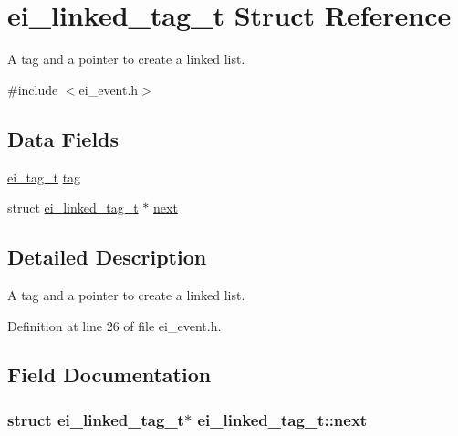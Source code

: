 \hypertarget{structei__linked__tag__t}{\section{ei\+\_\+linked\+\_\+tag\+\_\+t Struct Reference}
\label{structei__linked__tag__t}
}


A tag and a pointer to create a linked list.  




{\ttfamily \#include $<$ei\+\_\+event.\+h$>$}

\subsection*{Data Fields}
\begin{DoxyCompactItemize}
\item 
\hyperlink{ei__event_8h_a24a8242260cfd8ddb6ef915f3de5a10f}{ei\+\_\+tag\+\_\+t} \hyperlink{structei__linked__tag__t_aa1c771b8b7ac760ee10d33d5a29c97d7}{tag}
\item 
struct \hyperlink{structei__linked__tag__t}{ei\+\_\+linked\+\_\+tag\+\_\+t} $\ast$ \hyperlink{structei__linked__tag__t_a86bfd7536ee8b26a3f2b1a46562591e4}{next}
\end{DoxyCompactItemize}


\subsection{Detailed Description}
A tag and a pointer to create a linked list. 

Definition at line 26 of file ei\+\_\+event.\+h.



\subsection{Field Documentation}
\hypertarget{structei__linked__tag__t_a86bfd7536ee8b26a3f2b1a46562591e4}{
\subsubsection[{next}]{\setlength{\rightskip}{0pt plus 5cm}struct {\bf ei\+\_\+linked\+\_\+tag\+\_\+t}$\ast$ ei\+\_\+linked\+\_\+tag\+\_\+t\+::next}}\label{structei__linked__tag__t_a86bfd7536ee8b26a3f2b1a46562591e4}


